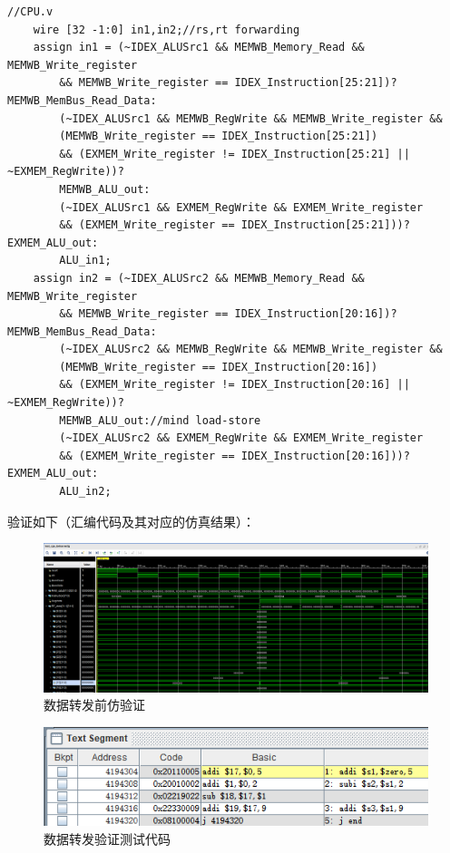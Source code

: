 \documentclass[10pt]{article}
\begin{document}
\begin{lstlisting}[style={verilog-style}]
    //CPU.v
    wire [32 -1:0] in1,in2;//rs,rt forwarding
    assign in1 = (~IDEX_ALUSrc1 && MEMWB_Memory_Read && MEMWB_Write_register 
        && MEMWB_Write_register == IDEX_Instruction[25:21])? MEMWB_MemBus_Read_Data:
        (~IDEX_ALUSrc1 && MEMWB_RegWrite && MEMWB_Write_register && 
        (MEMWB_Write_register == IDEX_Instruction[25:21])
        && (EXMEM_Write_register != IDEX_Instruction[25:21] || ~EXMEM_RegWrite))? 
        MEMWB_ALU_out:
        (~IDEX_ALUSrc1 && EXMEM_RegWrite && EXMEM_Write_register
        && (EXMEM_Write_register == IDEX_Instruction[25:21]))? EXMEM_ALU_out: 
        ALU_in1;
    assign in2 = (~IDEX_ALUSrc2 && MEMWB_Memory_Read && MEMWB_Write_register 
        && MEMWB_Write_register == IDEX_Instruction[20:16])? MEMWB_MemBus_Read_Data:
        (~IDEX_ALUSrc2 && MEMWB_RegWrite && MEMWB_Write_register && 
        (MEMWB_Write_register == IDEX_Instruction[20:16])
        && (EXMEM_Write_register != IDEX_Instruction[20:16] || ~EXMEM_RegWrite))? 
        MEMWB_ALU_out://mind load-store
        (~IDEX_ALUSrc2 && EXMEM_RegWrite && EXMEM_Write_register
        && (EXMEM_Write_register == IDEX_Instruction[20:16]))? EXMEM_ALU_out: 
        ALU_in2;
\end{lstlisting}
验证如下（汇编代码及其对应的仿真结果）：
\begin{figure}[H]
    \centering
    \includegraphics[scale=0.35]{haddaz.png}
    \caption{数据转发前仿验证}
    \end{figure}
    \begin{figure}[H]
        \centering
        \includegraphics[scale=0.9]{hadd.png}
        \caption{数据转发验证测试代码}
        \end{figure}
\end{document}
